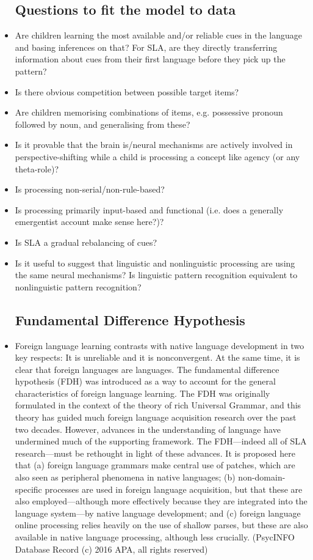 \documentclass{article}
\begin{document}
\begin{itemize}
    \subsection{Questions to fit the model to data}
    \item Are children learning the most available and/or reliable cues in the language and basing inferences on that? For SLA, are they directly transferring information about cues from their first language before they pick up the pattern?
    \item Is there obvious competition between possible target items?
    \item Are children memorising combinations of items, e.g. possessive pronoun followed by noun, and generalising from these?
    \item Is it provable that the brain is/neural mechanisms are actively involved in perspective-shifting while a child is processing a concept like agency (or any theta-role)?
    \item Is processing non-serial/non-rule-based?
    \item Is processing primarily input-based and functional (i.e. does a generally emergentist account make sense here?)?
    \item Is SLA a gradual rebalancing of cues?
    \item Is it useful to suggest that linguistic and nonlinguistic processing are using the same neural mechanisms? Is linguistic pattern recognition equivalent to nonlinguistic pattern recognition?
    \subsection{Fundamental Difference Hypothesis}
    \item Foreign language learning contrasts with native language development in two key respects: It is unreliable and it is nonconvergent. At the same time, it is clear that foreign languages are languages. The fundamental difference hypothesis (FDH) was introduced as a way to account for the general characteristics of foreign language learning. The FDH was originally formulated in the context of the theory of rich Universal Grammar, and this theory has guided much foreign language acquisition research over the past two decades. However, advances in the understanding of language have undermined much of the supporting framework. The FDH—indeed all of SLA research—must be rethought in light of these advances. It is proposed here that (a) foreign language grammars make central use of patches, which are also seen as peripheral phenomena in native languages; (b) non-domain-specific processes are used in foreign language acquisition, but that these are also employed—although more effectively because they are integrated into the language system—by native language development; and (c) foreign language online processing relies heavily on the use of shallow parses, but these are also available in native language processing, although less crucially. (PsycINFO Database Record (c) 2016 APA, all rights reserved)
\end{itemize}
\end{document}
